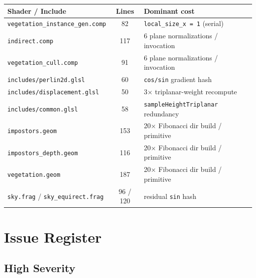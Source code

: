 \documentclass[a4paper,12pt]{article}
\begin{document}
\begin{center}
\begin{tabular}{lcl}
\toprule
\textbf{Shader / Include} & \textbf{Lines} & \textbf{Dominant cost} \\
\midrule
\texttt{vegetation\_instance\_gen.comp} & 82  & \texttt{local\_size\_x = 1} (serial) \\
\texttt{indirect.comp}                  & 117 & 6 plane normalizations / invocation \\
\texttt{vegetation\_cull.comp}          & 91  & 6 plane normalizations / invocation \\
\texttt{includes/perlin2d.glsl}        & 60  & \texttt{cos/sin} gradient hash \\
\texttt{includes/displacement.glsl}    & 50  & 3× triplanar-weight recompute \\
\texttt{includes/common.glsl}          & 58  & \texttt{sampleHeightTriplanar} redundancy \\
\texttt{impostors.geom}                & 153 & 20× Fibonacci dir build / primitive \\
\texttt{impostors\_depth.geom}         & 116 & 20× Fibonacci dir build / primitive \\
\texttt{vegetation.geom}               & 187 & 20× Fibonacci dir build / primitive \\
\texttt{sky.frag} / \texttt{sky\_equirect.frag} & 96 / 120 & residual \texttt{sin} hash \\
\bottomrule
\end{tabular}
\end{center}

\newpage

\section{Issue Register}

\subsection{High Severity}
\end{document}
